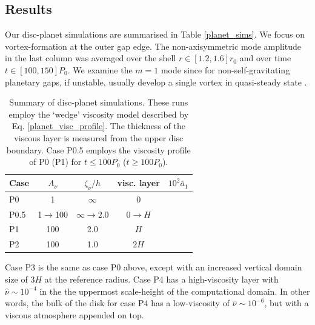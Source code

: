 

\subsection{Results}
Our disc-planet simulations are summarised in Table \ref{planet_sims}.
We focus on vortex-formation at the outer gap edge. 
The non-axisymmetric mode amplitude in the last column was 
averaged over the shell $r\in[1.2,1.6]r_0$ and over time 
$t\in[100,150]P_0$. We examine the $m=1$ mode since 
for non-self-gravitating planetary gaps, if unstable, usually develop
a single vortex in quasi-steady state \citep{valborro07,lin10}.   


\begin{table}
  \centering
  \caption{Summary of disc-planet simulations. These runs employ the
    `wedge' viscosity model described by
    Eq. \ref{planet_visc_profile}. The thickness of the viscous layer
    is measured from the upper disc boundary. Case P0.5 employs the
    viscosity profile of P0 (P1) for $t\leq100P_0$ ($t\geq100P_0$). }
    \begin{tabular}{lcccr}
      \hline\hline
      Case & $A_\nu$ &$\zeta_\nu/h$ & visc. layer& $10^2\overline{a}_1$ \\ 
      \hline
      P0      &    1     &    $\infty$      & 0     &       \\
      P0.5    &    1$\to$100 & $\infty\to2.0$ &$0\to H$ &     \\
       P1      &    100   &    2.0      & $H$   &       \\ 
      P2      &    100   &    1.0      & $2H$  &         \\ 
      \hline
  \end{tabular}
\end{table}


Case P3 is the same as case P0 above, except with an increased
vertical domain size of $3H$ at the reference radius. Case P4 has a high-viscosity layer with
$\hat{\nu}\sim10^{-4}$ in the the uppermost scale-height of the
computational domain. In other words, the bulk of the 
disk for case P4 has a low-viscosity of $\hat{\nu}\sim10^{-6}$, but
with a viscous atmosphere appended on top.  

